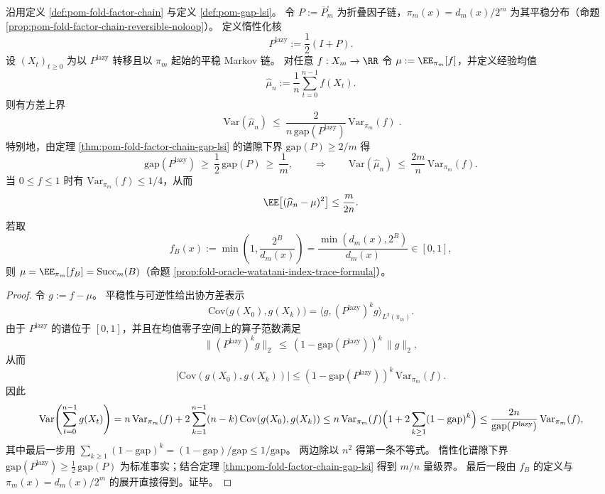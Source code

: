 \begin{proposition}\label{prop:pom-fold-factor-chain-effective-sample-size}
沿用定义 \ref{def:pom-fold-factor-chain} 与定义 \ref{def:pom-gap-lsi}。
令 \(P:=\overline P^{\square}_m\) 为折叠因子链，\(\pi_m(x)=d_m(x)/2^m\) 为其平稳分布（命题 \ref{prop:pom-fold-factor-chain-reversible-noloop}）。
定义惰性化核
\[
P^{\mathrm{lazy}}:=\frac12(I+P).
\]
设 \((X_t)_{t\ge 0}\) 为以 \(P^{\mathrm{lazy}}\) 转移且以 \(\pi_m\) 起始的平稳 Markov 链。
对任意 \(f:X_m\to\RR\) 令 \(\mu:=\EE_{\pi_m}[f]\)，并定义经验均值
\[
\widehat\mu_n:=\frac{1}{n}\sum_{t=0}^{n-1} f(X_t).
\]
则有方差上界
\[
\boxed{\;
\mathrm{Var}(\widehat\mu_n)\ \le\ \frac{2}{n\,\mathrm{gap}(P^{\mathrm{lazy}})}\,\mathrm{Var}_{\pi_m}(f)\; }.
\]
特别地，由定理 \ref{thm:pom-fold-factor-chain-gap-lsi} 的谱隙下界 \(\mathrm{gap}(P)\ge 2/m\) 得
\[
\mathrm{gap}(P^{\mathrm{lazy}})\ \ge\ \frac12\,\mathrm{gap}(P)\ \ge\ \frac{1}{m},
\qquad\Longrightarrow\qquad
\mathrm{Var}(\widehat\mu_n)\ \le\ \frac{2m}{n}\,\mathrm{Var}_{\pi_m}(f).
\]
当 \(0\le f\le 1\) 时有 \(\mathrm{Var}_{\pi_m}(f)\le 1/4\)，从而
\[
\EE\bigl[(\widehat\mu_n-\mu)^2\bigr]\le \frac{m}{2n}.
\]
若取
\[
f_B(x):=\min\!\left(1,\frac{2^B}{d_m(x)}\right)=\frac{\min(d_m(x),2^B)}{d_m(x)}\in[0,1],
\]
则 \(\mu=\EE_{\pi_m}[f_B]={\rm Succ}_m(B)\)（命题 \ref{prop:fold-oracle-watatani-index-trace-formula}）。
\end{proposition}
\begin{proof}
令 \(g:=f-\mu\)。
平稳性与可逆性给出协方差表示
\[
\mathrm{Cov}\bigl(g(X_0),g(X_k)\bigr)=\langle g,(P^{\mathrm{lazy}})^k g\rangle_{L^2(\pi_m)}.
\]
由于 \(P^{\mathrm{lazy}}\) 的谱位于 \([0,1]\)，并且在均值零子空间上的算子范数满足
\[
\bigl\|(P^{\mathrm{lazy}})^k g\bigr\|_2\ \le\ (1-\mathrm{gap}(P^{\mathrm{lazy}}))^k\,\|g\|_2,
\]
从而
\[
\bigl|\mathrm{Cov}(g(X_0),g(X_k))\bigr|
\le (1-\mathrm{gap}(P^{\mathrm{lazy}}))^k\,\mathrm{Var}_{\pi_m}(f).
\]
因此
\[
\mathrm{Var}\!\left(\sum_{t=0}^{n-1}g(X_t)\right)
=n\,\mathrm{Var}_{\pi_m}(f)+2\sum_{k=1}^{n-1}(n-k)\,\mathrm{Cov}(g(X_0),g(X_k))
\le n\,\mathrm{Var}_{\pi_m}(f)\Bigl(1+2\sum_{k\ge 1}(1-\mathrm{gap})^k\Bigr)
\le \frac{2n}{\mathrm{gap}(P^{\mathrm{lazy}})}\,\mathrm{Var}_{\pi_m}(f),
\]
其中最后一步用 \(\sum_{k\ge 1}(1-\mathrm{gap})^k=(1-\mathrm{gap})/\mathrm{gap}\le 1/\mathrm{gap}\)。
两边除以 \(n^2\) 得第一条不等式。
惰性化谱隙下界 \(\mathrm{gap}(P^{\mathrm{lazy}})\ge \frac12\,\mathrm{gap}(P)\) 为标准事实；结合定理 \ref{thm:pom-fold-factor-chain-gap-lsi} 得到 \(m/n\) 量级界。
最后一段由 \(f_B\) 的定义与 \(\pi_m(x)=d_m(x)/2^m\) 的展开直接得到。证毕。
\end{proof}

\endinput

